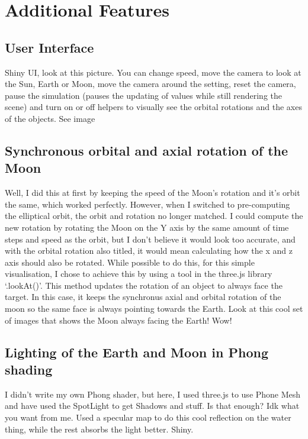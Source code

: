 \documentclass[12pt]{article}
\begin{document}

\section{Additional Features}
\subsection{User Interface}
Shiny UI, look at this picture. You can change speed, move the camera to look at the Sun, Earth or Moon, move the camera around the setting, reset the camera, pause the simulation (pauses the updating of values while still rendering the scene) and turn on or off helpers to visually see the orbital rotations and the axes of the objects. See image

\subsection{Synchronous orbital and axial rotation of the Moon}
Well, I did this at first by keeping the speed of the Moon's rotation and it's orbit the same, which worked perfectly. However, when I switched to pre-computing the elliptical orbit, the orbit and rotation no longer matched. I could compute the new rotation by rotating the Moon on the Y axis by the same amount of time steps and speed as the orbit, but I don't believe it would look too accurate, and with the orbital rotation also titled, it would mean calculating how the x and z axis should also be rotated. While possible to do this, for this simple visualisation, I chose to achieve this by using a tool in the three.js library `.lookAt()'. This method updates the rotation of an object to always face the target. In this case, it keeps the synchronus axial and orbital rotation of the moon so the same face is always pointing towards the Earth. Look at this cool set of images that shows the Moon always facing the Earth! Wow!

\subsection{Lighting of the Earth and Moon in Phong shading}
I didn't write my own Phong shader, but here, I used three.js to use Phone Mesh and have used the SpotLight to get Shadows and stuff. Is that enough? Idk what you want from me. Used a specular map to do this cool reflection on the water thing, while the rest absorbs the light better. Shiny.
\end{document}
